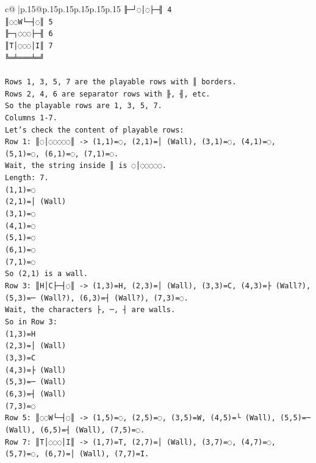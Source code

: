 \documentclass{article}
\begin{document}
{\begin{supertabular}{c@{$\;$}|p{.15\linewidth}@{}p{.15\linewidth}p{.15\linewidth}p{.15\linewidth}p{.15\linewidth}p{.15\linewidth}}
{{{\texttt{╟─┘◌│◌├─╢ 4} \\
\texttt{║◌◌W└─┤◌║ 5} \\
\texttt{╟─┐◌◌◌├─╢ 6} \\
\texttt{║T│◌◌◌│I║ 7} \\
\texttt{╚═╧═══╧═╝} \\
\\ 
\texttt{Rows 1, 3, 5, 7 are the playable rows with ║ borders.} \\
\texttt{Rows 2, 4, 6 are separator rows with ╟, ╢, etc.} \\
\texttt{So the playable rows are 1, 3, 5, 7.} \\
\texttt{Columns 1{-}7.} \\
\texttt{Let's check the content of playable rows:} \\
\texttt{Row 1: ║◌│◌◌◌◌◌║ {-}> (1,1)=◌, (2,1)=│ (Wall), (3,1)=◌, (4,1)=◌, (5,1)=◌, (6,1)=◌, (7,1)=◌.} \\
\texttt{Wait, the string inside ║ is ◌│◌◌◌◌◌.} \\
\texttt{Length: 7.} \\
\texttt{(1,1)=◌} \\
\texttt{(2,1)=│ (Wall)} \\
\texttt{(3,1)=◌} \\
\texttt{(4,1)=◌} \\
\texttt{(5,1)=◌} \\
\texttt{(6,1)=◌} \\
\texttt{(7,1)=◌} \\
\texttt{So (2,1) is a wall.} \\
\texttt{Row 3: ║H│C├─┤◌║ {-}> (1,3)=H, (2,3)=│ (Wall), (3,3)=C, (4,3)=├ (Wall?), (5,3)=─ (Wall?), (6,3)=┤ (Wall?), (7,3)=◌.} \\
\texttt{Wait, the characters ├, ─, ┤ are walls.} \\
\texttt{So in Row 3:} \\
\texttt{(1,3)=H} \\
\texttt{(2,3)=│ (Wall)} \\
\texttt{(3,3)=C} \\
\texttt{(4,3)=├ (Wall)} \\
\texttt{(5,3)=─ (Wall)} \\
\texttt{(6,3)=┤ (Wall)} \\
\texttt{(7,3)=◌} \\
\texttt{Row 5: ║◌◌W└─┤◌║ {-}> (1,5)=◌, (2,5)=◌, (3,5)=W, (4,5)=└ (Wall), (5,5)=─ (Wall), (6,5)=┤ (Wall), (7,5)=◌.} \\
\texttt{Row 7: ║T│◌◌◌│I║ {-}> (1,7)=T, (2,7)=│ (Wall), (3,7)=◌, (4,7)=◌, (5,7)=◌, (6,7)=│ (Wall), (7,7)=I.} \\
}}}
\end{supertabular}}
\end{document}
